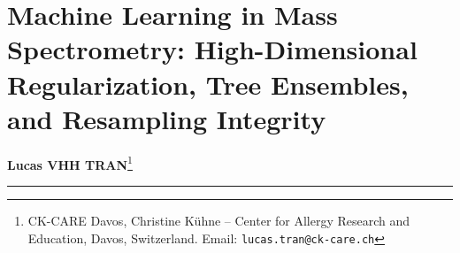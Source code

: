 \documentclass[11pt,oneside]{book}
\begin{document}
\setcounter{chapter}{22}
\chapter{Machine Learning in Mass Spectrometry: High-Dimensional Regularization, Tree Ensembles, and Resampling Integrity}

\noindent
\textbf{Lucas VHH TRAN}\footnote{CK-CARE Davos, Christine K\"uhne -- Center for Allergy Research and Education, Davos, Switzerland. Email: \texttt{lucas.tran@ck-care.ch}}\\
\rule{\textwidth}{0.8pt}

\begin{abstract}
\noindent
Multivariate predictive modeling in mass spectrometry aims to construct generalizable molecular signatures for patient stratification, disease diagnosis, and therapeutic response forecasting. Quantitative mass spectrometry operates in the high-dimensional regime where quantified features outnumber sample cohorts by one to three orders of magnitude ($p \gg n$; frequently $p \sim 10^3$--$10^5$ versus $n \sim 10^1$--$10^2$). In this geometry, ordinary least squares estimators are singular, and empirical classification accuracy can reach 100\% on random noise through geometric over-fitting.

This chapter details the statistical foundations and computational workflows required to train and validate machine learning models in mass spectrometry. We examine the geometric properties of high-dimensional Euclidean space, the Curse of Dimensionality, and Cover's theorem on linear separability. We derive the analytical properties of penalized loss functions, focusing on the Elastic Net and its grouping bound for collinear peptide and metabolite clusters. We analyze non-linear ensemble architectures, including Random Forests and Gradient Boosted Decision Trees (XGBoost), compare Gini impurity against game-theoretic SHAP feature importance, and address Partial Least Squares Discriminant Analysis (PLS-DA). We establish resampling protocols to prevent data leakage, covering nested cross-validation, class-imbalance corrections, probability calibration (Brier score, Expected Calibration Error, and Platt scaling), and clinical decision curve analysis. The chapter provides an executable R laboratory using the \texttt{tidymodels} framework, the Five Deadly Sins of omics machine learning, a diagnostic checklist, and worked exercises with solutions.
\end{abstract}
\end{document}
